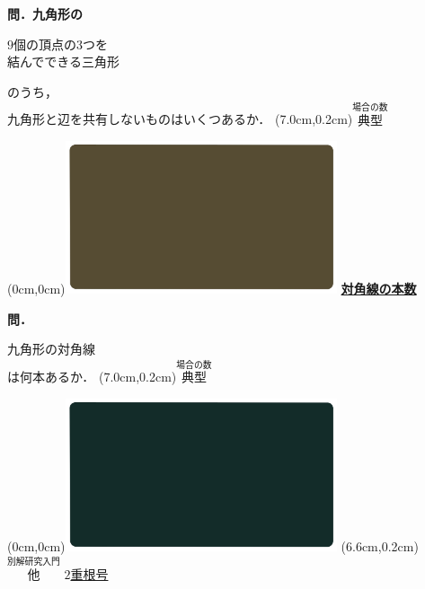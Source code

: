 \documentclass[10pt,
fleqn,
dvipdfmx,
uplatex
]{jsarticle}
\begin{document}
\normalsize 
\bf\boldmath 問．九角形の

\huge
\vspace{-0.2zw}
\hspace{0.1zw} $9$個の頂点の$3$つを\\
\hfill 結んでできる三角形 \hspace{0.1zw}

\normalsize
\vspace{-0.2zw}
のうち，\vspace{-0.2zw}\\
\hfill 九角形と辺を共有しないものはいくつあるか．
\at(7.0cm,0.2cm){\small\color{bradorange}$\overset{\text{場合の数}}{\text{典型}}$}

\newpage

\at(0cm,0cm){\includegraphics[width=8cm,bb=0 0 1920 1080]{./youtube/thumbnails/templates/smart_background/場合の数.jpeg}}
{\color{orange}\bf\boldmath\huge\underline{対角線の本数}}\vspace{0.3zw}

\large
\bf\boldmath 問．

\HUGE
\vspace{-0.6zw}
\hspace{0.00zw}
九角形の対角線\\
\hfill は何本あるか．
\at(7.0cm,0.2cm){\small\color{bradorange}$\overset{\text{場合の数}}{\text{典型}}$}

\newpage



\at(0cm,0cm){\includegraphics[width=8cm,bb=0 0 1920 1080]{./youtube/thumbnails/templates/smart_background/黒板風.jpeg}}
\at(6.6cm,0.2cm){\small\color{bradorange}$\overset{\text{別解研究入門}}{\text{他}}$}
{\color{orange}\huge\underline{$2$重根号}}\vspace{0.3zw}
\end{document}
